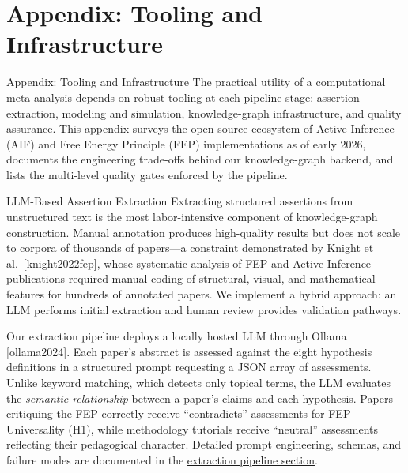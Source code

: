\documentclass[
  ignorenonframetext,
]{beamer}
\author{\texorpdfstring{}{}}
\date{}
\providecommand{\citep}[1]{[#1]}
\begin{document}
\section{\texorpdfstring{Appendix: Tooling and Infrastructure
\label{sec:tooling}}{Appendix: Tooling and Infrastructure }}\label{appendix-tooling-and-infrastructure}

\begin{frame}[allowframebreaks]{Appendix: Tooling and Infrastructure
\label{sec:tooling}}
The practical utility of a computational meta-analysis depends on robust
tooling at each pipeline stage: assertion extraction, modeling and
simulation, knowledge-graph infrastructure, and quality assurance. This
appendix surveys the open-source ecosystem of Active Inference (AIF) and
Free Energy Principle (FEP) implementations as of early 2026, documents
the engineering trade-offs behind our knowledge-graph backend, and lists
the multi-level quality gates enforced by the pipeline.
\end{frame}

\begin{frame}[allowframebreaks]{LLM-Based Assertion Extraction}
\protect{}\label{llm-based-assertion-extraction}
Extracting structured assertions from unstructured text is the most
labor-intensive component of knowledge-graph construction. Manual
annotation produces high-quality results but does not scale to corpora
of thousands of papers---a constraint demonstrated by Knight et
al.~\citep{knight2022fep}, whose systematic analysis of FEP and Active
Inference publications required manual coding of structural, visual, and
mathematical features for hundreds of annotated papers. We implement a
hybrid approach: an LLM performs initial extraction and human review
provides validation pathways.

Our extraction pipeline deploys a locally hosted LLM through Ollama
\citep{ollama2024}. Each paper's abstract is assessed against the eight
hypothesis definitions in a structured prompt requesting a JSON array of
assessments. Unlike keyword matching, which detects only topical terms,
the LLM evaluates the \emph{semantic relationship} between a paper's
claims and each hypothesis. Papers critiquing the FEP correctly receive
``contradicts'' assessments for FEP Universality (H1), while methodology
tutorials receive ``neutral'' assessments reflecting their pedagogical
character. Detailed prompt engineering, schemas, and failure modes are
documented in the
\hyperref[sec:extraction_pipeline]{extraction pipeline section}.
\end{frame}
\end{document}
